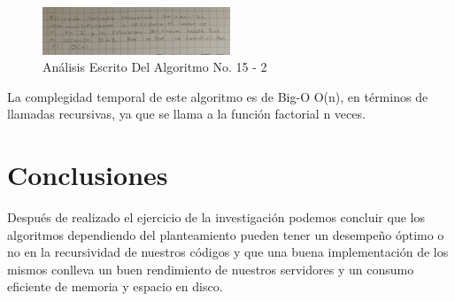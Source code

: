 \documentclass[journal, spanish]{IEEEtran}
\begin{document}
\begin{figure}[H]
  \centering
  \includegraphics[width=0.5\textwidth]{images/IMG_20230913_023630.jpg}
  \caption{Análisis Escrito Del Algoritmo No. 15 - 2}
  \label{fig:nombre_de_tu_imagen}
\end{figure}

La complegidad temporal de este algoritmo es de Big-O O(n), en términos de llamadas recursivas, ya que se llama a la función factorial n veces.

\section{Conclusiones}

Después de realizado el ejercicio de la investigación podemos concluir que los algoritmos dependiendo del planteamiento pueden tener un desempeño óptimo o no en la recursividad de nuestros códigos y que una buena implementación  de los mismos conlleva un buen rendimiento de nuestros servidores y un consumo eficiente de memoria y espacio en disco.




\vspace{12pt}
\end{document}
